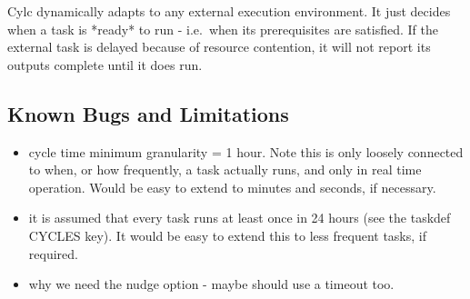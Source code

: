 \documentclass[11pt,a4paper]{article}
\begin{document}
Cylc dynamically adapts to any external execution environment. It just
decides when a task is *ready* to run - i.e.\ when its prerequisites 
are satisfied.  If the external task is delayed because of resource
contention, it will not report its outputs complete until it does run.

\subsection{Known Bugs and Limitations}

\begin{itemize}
    \item cycle time minimum granularity = 1 hour. Note this is
        only loosely connected to when, or how frequently, a task
        actually runs, and only in real time operation. Would be easy to
        extend to minutes and seconds, if necessary.

    \item it is assumed that every task runs at least once in 24 hours
        (see the taskdef CYCLES key). It would be easy to extend this to
        less frequent tasks, if required.

    \item why we need the nudge option - maybe should use a timeout too.

\end{itemize}
\end{document}

